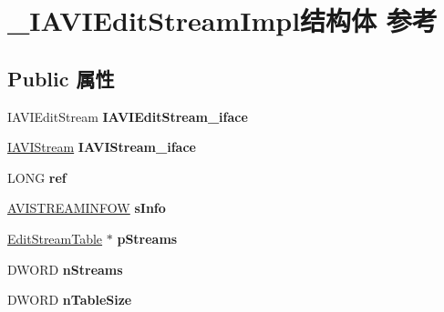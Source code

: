 \hypertarget{struct___i_a_v_i_edit_stream_impl}{}\section{\+\_\+\+I\+A\+V\+I\+Edit\+Stream\+Impl结构体 参考}
\label{struct___i_a_v_i_edit_stream_impl}
\subsection*{Public 属性}
\begin{DoxyCompactItemize}
\item 
\mbox{\label{struct___i_a_v_i_edit_stream_impl_ade9e376158599c762aef514371c9d34d}} 
I\+A\+V\+I\+Edit\+Stream {\bfseries I\+A\+V\+I\+Edit\+Stream\+\_\+iface}
\item 
\mbox{\label{struct___i_a_v_i_edit_stream_impl_a90f378484e0e356c8d8561a6251c1003}} 
\hyperlink{interface_i_a_v_i_stream}{I\+A\+V\+I\+Stream} {\bfseries I\+A\+V\+I\+Stream\+\_\+iface}
\item 
\mbox{\label{struct___i_a_v_i_edit_stream_impl_a9407550de707425afa059f444ad37597}} 
L\+O\+NG {\bfseries ref}
\item 
\mbox{\label{struct___i_a_v_i_edit_stream_impl_a9161e323d1b48080c55653ca8ecd02a9}} 
\hyperlink{struct___a_v_i_s_t_r_e_a_m_i_n_f_o_w}{A\+V\+I\+S\+T\+R\+E\+A\+M\+I\+N\+F\+OW} {\bfseries s\+Info}
\item 
\mbox{\label{struct___i_a_v_i_edit_stream_impl_a5b8d9873c7ddde6332cd896db92c7e2b}} 
\hyperlink{struct___edit_stream_table}{Edit\+Stream\+Table} $\ast$ {\bfseries p\+Streams}
\item 
\mbox{\label{struct___i_a_v_i_edit_stream_impl_adcceb00894a519a0e7e6bea0a7f3f391}} 
D\+W\+O\+RD {\bfseries n\+Streams}
\item 
\mbox{\label{struct___i_a_v_i_edit_stream_impl_ac9cc65e332af2f8e69192d8335db5127}} 
D\+W\+O\+RD {\bfseries n\+Table\+Size}

\end{DoxyCompactItemize}
